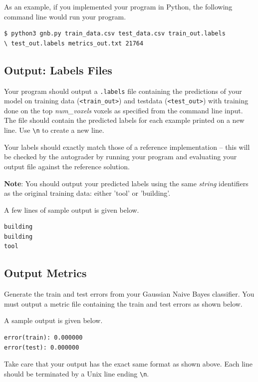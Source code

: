\documentclass[11pt,addpoints,answers]{exam}
\begin{document}
As an example, if you implemented your program in Python, the following command line would run your program.
\\
\begin{lstlisting}[language=Shell]
$ python3 gnb.py train_data.csv test_data.csv train_out.labels 
\ test_out.labels metrics_out.txt 21764

\end{lstlisting}

\subsection{Output: Labels Files} \label{output}
Your program should output a \texttt{.labels} file containing the predictions of your model on training data (\texttt{<train\_out>}) and test\thinspace data (\texttt{<test\_out>}) with training done on the top \textit{num\_voxels} voxels as specified from the command line input. The file should contain the predicted labels for each example printed on a new line. Use \lstinline{\n} to create a new line. 

Your labels should exactly match those of a reference implementation -- this will be checked by the autograder by running your program and evaluating your output file against the reference solution.

\textbf{Note}: You should output your predicted labels using the same \emph{string} identifiers as the original training data: either 'tool' or 'building'. 

A few lines of sample output is given below. 

\begin{lstlisting}
building
building
tool
\end{lstlisting}

\subsection{Output Metrics} \label{metrics}
Generate the train and test errors from your Gaussian Naive Bayes classifier. You must output a metric file containing the train and test errors as shown below. 

A sample output is given below. 

\begin{lstlisting}
error(train): 0.000000
error(test): 0.000000
\end{lstlisting}

Take care that your output has the exact same format as shown above. Each line should be terminated by a Unix line ending \lstinline{\n}.
\end{document}
